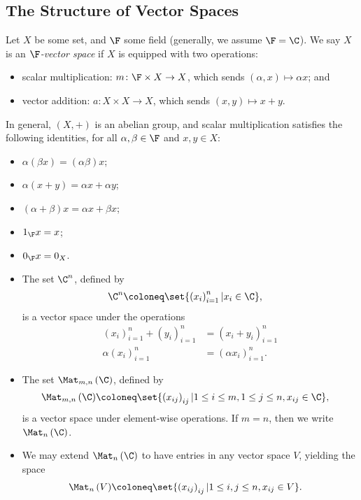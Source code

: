 \subsection{The Structure of Vector Spaces}%
\begin{definition}
  Let $X$ be some set, and $\F$ some field (generally, we assume $\F = \C$). We say $X$ is an $\F$\textit{-vector space} if $X$ is equipped with two operations:
  \begin{itemize}
    \item scalar multiplication: $m\colon \F\times X \rightarrow X$, which sends $\left(\alpha,x\right)\mapsto \alpha x$; and
    \item vector addition: $a\colon X\times X \rightarrow X$, which sends $\left(x,y\right)\mapsto x + y$.
  \end{itemize}
  In general, $\left(X,+\right)$ is an abelian group, and scalar multiplication satisfies the following identities, for all $\alpha,\beta \in \F$ and $x,y\in X$:
  \begin{itemize}
    \item $\alpha \left(\beta x\right) = \left(\alpha\beta\right)x$;
    \item $\alpha\left(x+y\right) = \alpha x + \alpha y$;
    \item $\left(\alpha + \beta\right)x = \alpha x + \beta x$;
    \item $1_{\F}x = x$;
    \item $0_{\F} x = 0_X$.
  \end{itemize}
\end{definition}
\begin{example}\hfill
  \begin{itemize}
    \item The set $\C^n$, defined by
      \begin{align*}
        \C^n &\coloneq \set{\left( x_i \right)_{i=1}^{n} | x_i\in \C},
      \end{align*}
      is a vector space under the operations
      \begin{align*}
        \left( x_{i} \right)_{i=1}^{n} + \left( y_i \right)_{i=1}^{n} &= \left( x_i + y_i \right)_{i=1}^{n}\\
        \alpha \left( x_i \right)_{i=1}^{n} &= \left( \alpha x_i \right)_{i=1}^{n}.
      \end{align*}
    \item The set $\Mat_{m,n}\left( \C \right)$, defined by
      \begin{align*}
        \Mat_{m,n}\left( \C \right) &\coloneq \set{\left( x_{ij} \right)_{ij} | 1\leq i\leq m,1\leq j\leq n,x_{ij}\in \C},
      \end{align*}
      is a vector space under element-wise operations. If $m = n$, then we write $\Mat_n\left( \C \right)$.
    \item We may extend $\Mat_n\left( \C \right)$ to have entries in any vector space $V$, yielding the space
      \begin{align*}
        \Mat_n\left( V \right) &\coloneq \set{\left( x_{ij} \right)_{ij} | 1\leq i,j\leq n,x_{ij}\in V}.
      \end{align*}
  \end{itemize}
\end{example}
